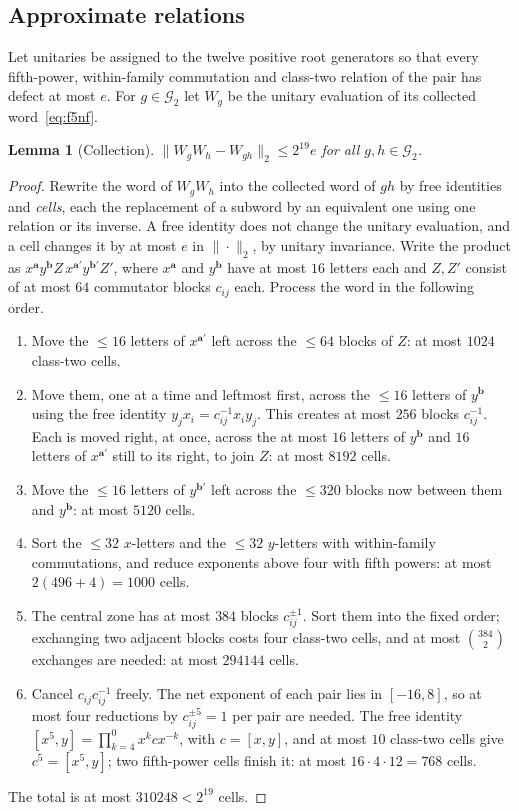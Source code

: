 \documentclass[11pt]{article}
\newtheorem{lemma}[theorem]{Lemma}
\begin{document}
\subsection*{Approximate relations}
Let unitaries be assigned to the twelve positive root generators so that every fifth-power, within-family commutation and class-two relation of the pair has defect at most $e$.  For $g\in\mathcal G_2$ let $W_g$ be the unitary evaluation of its collected word~\eqref{eq:f5nf}.

\begin{lemma}[Collection]\label{lem:f5collection}
$\|W_gW_h-W_{gh}\|_2\le2^{19}e$ for all $g,h\in\mathcal G_2$.
\end{lemma}
\begin{proof}
Rewrite the word of $W_gW_h$ into the collected word of $gh$ by free identities and \emph{cells}, each the replacement of a subword by an equivalent one using one relation or its inverse.  A free identity does not change the unitary evaluation, and a cell changes it by at most $e$ in $\|\cdot\|_2$, by unitary invariance.  Write the product as $x^{\mathbf a}y^{\mathbf b}Z\,x^{\mathbf a'}y^{\mathbf b'}Z'$, where $x^{\mathbf a}$ and $y^{\mathbf b}$ have at most $16$ letters each and $Z,Z'$ consist of at most $64$ commutator blocks $c_{ij}$ each.  Process the word in the following order.
\begin{enumerate}[label=(\arabic*)]
\item Move the $\le16$ letters of $x^{\mathbf a'}$ left across the $\le64$ blocks of $Z$: at most $1024$ class-two cells.
\item Move them, one at a time and leftmost first, across the $\le16$ letters of $y^{\mathbf b}$ using the free identity $y_jx_i=c_{ij}^{-1}x_iy_j$.  This creates at most $256$ blocks $c_{ij}^{-1}$.  Each is moved right, at once, across the at most $16$ letters of $y^{\mathbf b}$ and $16$ letters of $x^{\mathbf a'}$ still to its right, to join $Z$: at most $8192$ cells.
\item Move the $\le16$ letters of $y^{\mathbf b'}$ left across the $\le320$ blocks now between them and $y^{\mathbf b}$: at most $5120$ cells.
\item Sort the $\le32$ $x$-letters and the $\le32$ $y$-letters with within-family commutations, and reduce exponents above four with fifth powers: at most $2(496+4)=1000$ cells.
\item The central zone has at most $384$ blocks $c_{ij}^{\pm1}$.  Sort them into the fixed order; exchanging two adjacent blocks costs four class-two cells, and at most $\binom{384}2$ exchanges are needed: at most $294144$ cells.
\item Cancel $c_{ij}c_{ij}^{-1}$ freely.  The net exponent of each pair lies in $[-16,8]$, so at most four reductions by $c_{ij}^{\pm5}=1$ per pair are needed.  The free identity $[x^5,y]=\prod_{k=4}^{0}x^kcx^{-k}$, with $c=[x,y]$, and at most $10$ class-two cells give $c^5=[x^5,y]$; two fifth-power cells finish it: at most $16\cdot4\cdot12=768$ cells.
\end{enumerate}
The total is at most $310248<2^{19}$ cells.
\end{proof}
\end{document}
